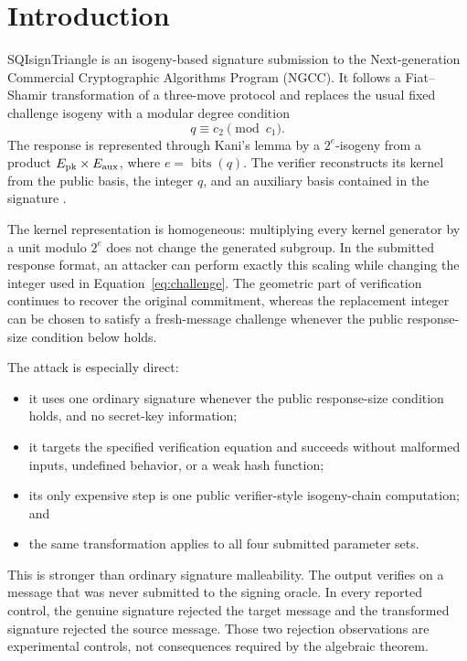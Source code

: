 \documentclass[11pt,a4paper]{article}
\newcommand{\bits}{\operatorname{bits}}
\begin{document}
\section{Introduction}

SQIsignTriangle is an isogeny-based signature submission to the
Next-generation Commercial Cryptographic Algorithms Program (NGCC). It follows a
Fiat--Shamir transformation of a three-move protocol and replaces the usual
fixed challenge isogeny with a modular degree condition
\begin{equation}
                         q\equiv c_2\pmod{c_1}.
  \label{eq:challenge}
\end{equation}
The response is represented through Kani's lemma by a
$2^e$-isogeny from a product $E_{\rm pk}\times E_{\rm aux}$, where
$e=\bits(q)$. The verifier reconstructs its kernel from the public basis, the
integer $q$, and an auxiliary basis contained in the signature
\cite{sqitriangle-spec}.

The kernel representation is homogeneous: multiplying every kernel
generator by a unit modulo $2^e$ does not change the generated subgroup. In
the submitted response format, an attacker can perform exactly this scaling
while changing the integer used in Equation~\eqref{eq:challenge}. The
geometric part of verification continues to recover the original commitment,
whereas the replacement integer can be chosen to satisfy a fresh-message
challenge whenever the public response-size condition below holds.

The attack is especially direct:
\begin{itemize}[leftmargin=1.5em]
  \item it uses one ordinary signature whenever the public response-size
        condition holds, and no secret-key information;
  \item it targets the specified verification equation and succeeds without
        malformed inputs, undefined behavior, or a weak hash function;
  \item its only expensive step is one public verifier-style isogeny-chain
        computation; and
  \item the same transformation applies to all four submitted parameter sets.
\end{itemize}

This is stronger than ordinary signature malleability. The output verifies on
a message that was never submitted to the signing oracle. In every reported
control, the genuine signature rejected the target message and the transformed
signature rejected the source message. Those two rejection observations are
experimental controls, not consequences required by the algebraic theorem.
\end{document}
